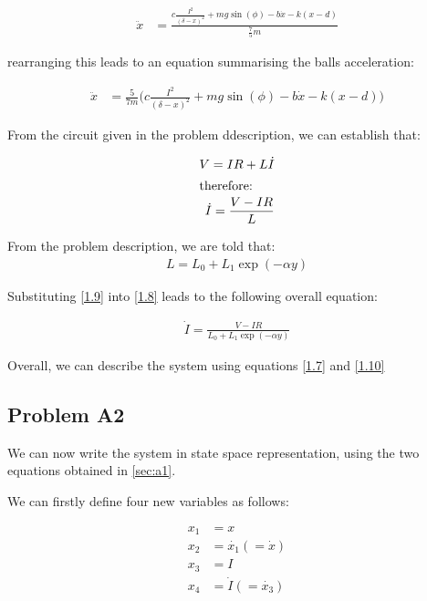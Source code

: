 \documentclass[a4paper,10pt,reqno]{amsart}
\numberwithin{equation}{section}
\begin{document}
\begin{align}
\ddot{x} &= \frac{c \frac{I^2}{(\delta - x)^2} + mg\sin(\phi) - b\dot{x} - k(x-d)}{\frac{7}{5}m} \label{1.6}
\end{align}

rearranging this leads to an equation summarising the balls acceleration:

\begin{align}
\ddot{x} &= \frac{5}{7m}\bigg(c \frac{I^2}{(\delta - x)^2} + mg\sin(\phi) - b\dot{x} - k(x-d)\bigg) \label{1.7}
\end{align}

\newline From the circuit given in the problem ddescription, we can establish that:

\begin{align}
V = IR + L\dot{I} \nonumber \\
\intertext{therefore:}
\dot{I} = \frac{V - IR}{L} \label{1.8}
\end{align}

\newline From the problem description, we are told that:
\begin{align}
L = L_0 + L_1\exp(-\alpha y) \label{1.9}
\end{align}

\newline Substituting \ref{1.9} into \ref{1.8} leads to the following overall equation:

\begin{align}
\dot{I} = \frac{V - IR}{L_0 + L_1\exp(-\alpha y)} \label{1.10}
\end{align}

\newline Overall, we can describe the system using equations \ref{1.7} and \ref{1.10}

\subsection{Problem A2}\label{sec:a2}
We can now write the system in state space representation, using the two equations obtained in \ref{sec:a1}.
\vspace{4mm}

We can firstly define four new variables as follows:

\begin{align}
x_1 &= x \label{1.11} \\
x_2 &= \dot{x_1} (= \dot{x}) \label{1.12} \\
x_3 &= I \label{1.13} \\
x_4 &= \dot{I} (= \dot{x_3}) \label{1.14}
\end{align}
\end{document}
